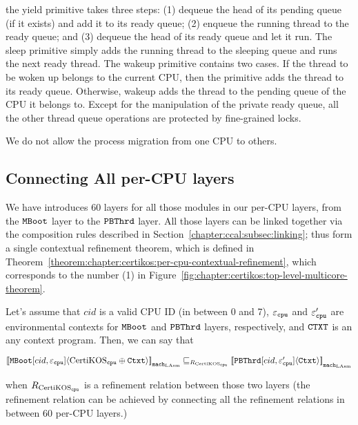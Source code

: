 the yield primitive takes three steps: (1) dequeue the head of its pending queue (if it exists) and add it to its ready queue; (2) enqueue the running thread to the ready queue; and (3) dequeue the head of its ready queue and let it run. The sleep primitive simply adds the running thread to the sleeping queue and runs the next ready thread. The wakeup primitive contains two cases. If the thread to be woken up belongs to the current CPU, then the primitive adds the thread to its ready queue. Otherwise, wakeup adds the thread to the pending queue of the CPU it belongs to. Except for the manipulation of the private ready queue, all the other thread queue operations are protected by fine-grained locks.


We do not allow the process migration from one CPU to others. 

\subsection{Connecting All per-CPU layers}
\label{chapter:certikos:subsec:connecting-all-per-cpu-layers}

We have introduces 60 layers for all those modules in our per-CPU layers, from the ${\mathrm{\texttt{MBoot}}}$ layer to the 
${\mathrm{\texttt{PBThrd}}}$ layer.
All those layers can be linked together via the composition rules described in Section~\ref{chapter:ccal:subsec:linking};
thus form a single contextual refinement theorem, which is defined in Theorem~\ref{theorem:chapter:certikos:per-cpu-contextual-refinement},
which corresponds to the number (1) in Figure~\ref{fig:chapter:certikos:top-level-multicore-theorem}.
\begin{theorem}
\label{theorem:chapter:certikos:per-cpu-contextual-refinement}
Let's assume that $cid$ is a valid CPU ID (in between 0 and 7), ${\varepsilon}_{{\mathrm{\texttt{cpu}}}}$ and  ${\varepsilon}'_{{\mathrm{\texttt{cpu}}}}$ are 
environmental contexts for ${\mathrm{\texttt{MBoot}}}$  and ${\mathrm{\texttt{PBThrd}}}$ layers, respectively, and ${\mathrm{\texttt{CTXT}}}$ is an any context program. Then, we can say that
\begin{center}
${[\![{{\mathrm{\texttt{MBoot}}}[cid, {\varepsilon}_{{\mathrm{\texttt{cpu}}}}]} \langle {\mathrm{CertiKOS}_{{\mathrm{\texttt{cpu}}}} \oplus {\mathrm{\texttt{Ctxt}}}} \rangle]\!]}_{{\mathrm{\texttt{mach}}}_{\mathrm{LAsm}}} \sqsubseteq_{R_{\mathrm{CertiKOS}_{\mathrm{\texttt{cpu}}}}} {[\![{{\mathrm{\texttt{PBThrd}}}[cid, {\varepsilon}'_{{\mathrm{\texttt{cpu}}}}]} \langle {{\mathrm{\texttt{Ctxt}}}} \rangle]\!]}_{{{\mathrm{\texttt{mach}}}_{\mathrm{LAsm}}}}$
\end{center}
when ${R_{\mathrm{CertiKOS}_{\mathrm{\texttt{cpu}}}}}$ is a refinement relation between those two layers (the refinement relation can be achieved by 
connecting all the refinement relations in between 60 per-CPU layers.)
\end{theorem}

